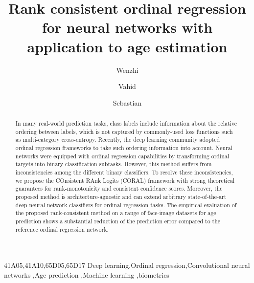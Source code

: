 \documentclass[times,twocolumn,final,authoryear]{elsarticle}
\begin{document}
\ifpreprint
  \setcounter{page}{1}
\else
  \setcounter{page}{1}
\fi

\begin{frontmatter}

\title{Rank consistent ordinal regression for neural networks with application to age estimation}

\author[1]{Wenzhi } 
\author[2]{Vahid }
\author[1]{Sebastian }


\address[1]{University of Wisconsin-Madison, Department of Statistics, 1300 University Ave, Madison, WI 53705, USA}
\address[2]{Michigan State University, Department of Computer Science \& Engineering, 428 South Shaw Lane, East Lansing, MI 48824, USA}




\begin{abstract}
In many real-world prediction tasks, class labels include information about the relative ordering between labels, which is not captured by commonly-used loss functions such as multi-category cross-entropy. Recently, the deep learning community adopted ordinal regression frameworks to take such ordering information into account. Neural networks were equipped with ordinal regression capabilities by transforming ordinal targets into binary classification subtasks. However, this method suffers from inconsistencies among the different binary classifiers. To resolve these inconsistencies, we propose the COnsistent RAnk Logits (CORAL) framework with strong theoretical guarantees for rank-monotonicity and consistent confidence scores. Moreover, the proposed method is architecture-agnostic and can extend arbitrary state-of-the-art deep neural network classifiers for ordinal regression tasks. The empirical evaluation of the proposed rank-consistent method on a range of face-image datasets for age prediction shows a substantial reduction of the prediction error compared to the reference ordinal regression network.
\end{abstract}

\begin{keyword}
\MSC 41A05\sep 41A10\sep 65D05\sep 65D17
\KWD Deep learning\sep Ordinal regression\sep Convolutional neural networks \sep Age prediction \sep Machine learning \sep biometrics
\end{keyword}

\end{frontmatter}
\end{document}
